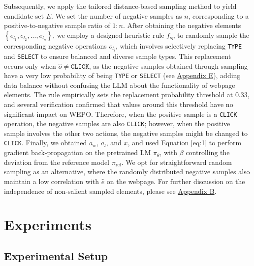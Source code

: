 \documentclass{article}
\begin{document}
  
  Subsequently, we apply the tailored distance-based sampling method to yield candidate set \( E \). We set the number of negative samples as \( n \), corresponding to a positive-to-negative sample ratio of $1:n$. After obtaining the negative elements $\left \{ e_{l_1}, e_{l_2}, ..., e_{l_n} \right \}$, we employ a designed heuristic rule $f_{op}$ to randomly sample the corresponding negative operations $o_{l_i}$, which involves selectively replacing \texttt{TYPE} and \texttt{SELECT} to ensure balanced and diverse sample types. This replacement occurs only when $\hat{o} \ne \texttt{CLICK}$, as the negative samples obtained through sampling have a very low probability of being \texttt{TYPE} or \texttt{SELECT} (see \hyperref[sec:stat]{Appendix E}), adding data balance without confusing the LLM about the functionality of webpage elements. The rule empirically sets the replacement probability threshold at $0.33$, and several verification confirmed that values around this threshold have no significant impact on WEPO. Therefore, when the positive sample is a \texttt{CLICK} operation, the negative samples are also \texttt{CLICK}; however, when the positive sample involves the other two actions, the negative samples might be changed to \texttt{CLICK}. Finally, we obtained \( a_w \), \( a_l \), and \( x \), and used Equation \ref{eq:1} to perform gradient back-propagation on the pretrained LM $\pi_{\theta}$, with $\beta$ controlling the deviation from the reference model $\pi_{\mathrm{ref}}$. We opt for straightforward random sampling as an alternative, where the randomly distributed negative samples also maintain a low correlation with $\hat{e}$ on the webpage. For further discussion on the independence of non-salient sampled elements, please see \hyperref[sec:hypo]{Appendix B}.
  

  \section{Experiments}
    
  \subsection{Experimental Setup}
    
\end{document}
